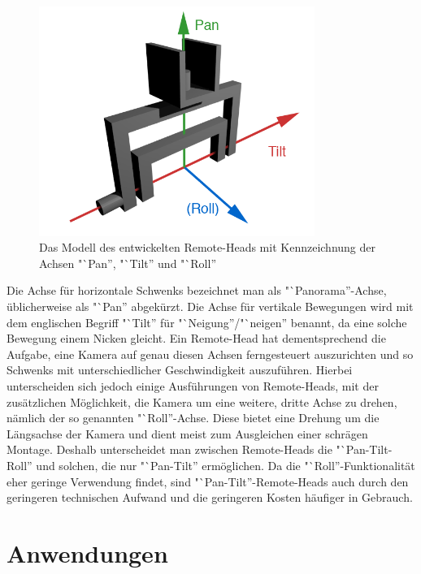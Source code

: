 \documentclass[a4paper, 12pt, bibliography=totocnumbered, listof=numbered]{scrartcl}
\begin{document}
	\begin{figure}[htb]
		\centering
		\includegraphics[width=0.8\textwidth]{Bilder/3D-Remote-Head/3D-Remote-Head}
		\caption{Das Modell des entwickelten Remote-Heads mit Kennzeichnung der Achsen "`Pan'', "`Tilt'' und "`Roll''}
	\end{figure}

	Die Achse für horizontale Schwenks bezeichnet man als "`Panorama”-Achse, üblicherweise als "`Pan” abgekürzt. Die Achse für vertikale Bewegungen wird mit dem englischen Begriff "`Tilt” für "`Neigung”/"`neigen” benannt, da eine solche Bewegung einem Nicken gleicht.
	Ein Remote-Head hat dementsprechend die Aufgabe, eine Kamera auf genau diesen Achsen ferngesteuert auszurichten und so Schwenks mit unterschiedlicher Geschwindigkeit auszuführen. Hierbei unterscheiden sich jedoch einige Ausführungen von Remote-Heads, mit der zusätzlichen Möglichkeit, die Kamera um eine weitere, dritte Achse zu drehen, nämlich der so genannten "`Roll”-Achse. Diese bietet eine Drehung um die Längsachse der Kamera und dient meist zum Ausgleichen einer schrägen Montage. Deshalb unterscheidet man zwischen Remote-Heads die "`Pan-Tilt-Roll” und solchen, die nur "`Pan-Tilt” ermöglichen. Da die "`Roll”-Funktionalität eher geringe Verwendung findet, sind "`Pan-Tilt”-Remote-Heads auch durch den geringeren technischen Aufwand und die geringeren Kosten häufiger in Gebrauch.

	\section{Anwendungen}
\end{document}

